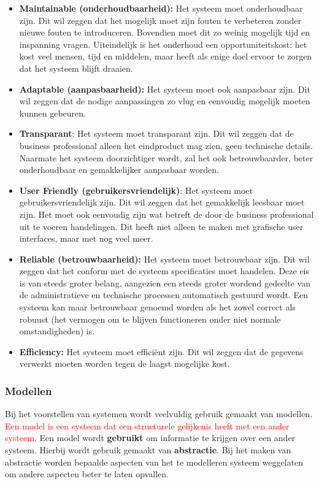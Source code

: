 \begin{itemize}
\item \textbf{Maintainable (onderhoudbaarheid):}
Het systeem moet onderhoudbaar zijn. Dit wil zeggen dat het mogelijk moet zijn fouten te verbeteren zonder nieuwe fouten te introduceren. Bovendien moet dit zo weinig mogelijk tijd en inspanning vragen. Uiteindelijk is het onderhoud een opportuniteitskost: het kost veel mensen, tijd en middelen, maar heeft als enige doel ervoor te zorgen dat het systeem blijft draaien.
\item \textbf{Adaptable (aanpasbaarheid):}
Het systeem moet ook aanpasbaar zijn. Dit wil zeggen dat de nodige aanpassingen zo vlug en eenvoudig mogelijk moeten kunnen gebeuren.
\item \textbf{Transparant}:
Het systeem moet transparant zijn. Dit wil zeggen dat de business professional alleen het eindproduct mag zien, geen technische details. Naarmate het systeem doorzichtiger wordt, zal het ook betrouwbaarder, beter onderhoudbaar en gemakkelijker aanpasbaar worden.
\item \textbf{User Friendly (gebruikersvriendelijk)}:
Het systeem moet gebruikersvriendelijk zijn. Dit wil zeggen dat het gemakkelijk leesbaar moet zijn. Het moet ook eenvoudig zijn wat betreft de door de business professional uit te voeren handelingen. Dit heeft niet alleen te maken met grafische user interfaces, maar met nog veel meer.
\item \textbf{Reliable (betrouwbaarheid):}
Het systeem moet betrouwbaar zijn. Dit wil zeggen dat het conform met de systeem specificaties moet handelen. Deze eis is van steeds groter belang, aangezien een steeds groter wordend gedeelte van de administratieve en technische processen automatisch gestuurd wordt. Een systeem kan maar betrouwbaar genoemd worden als het zowel correct als robuust (het vermogen om te blijven functioneren onder niet normale omstandigheden) is.
\item \textbf{Efficiency:}
Het systeem moet efficiënt zijn. Dit wil zeggen dat de gegevens verwerkt moeten worden tegen de laagst mogelijke kost.
\end{itemize}

\subsubsection{Modellen}

Bij het voorstellen van systemen wordt veelvuldig gebruik gemaakt van modellen. \textcolor{red}{Een model is een systeem dat een structurele gelijkenis heeft met een ander systeem}. Een model wordt \textbf{gebruikt} om informatie te krijgen over een ander systeem. Hierbij wordt gebruik gemaakt van \textbf{abstractie}. Bij het maken van abstractie worden bepaalde aspecten van het te modelleren systeem weggelaten om andere aspecten beter te laten opvallen.

